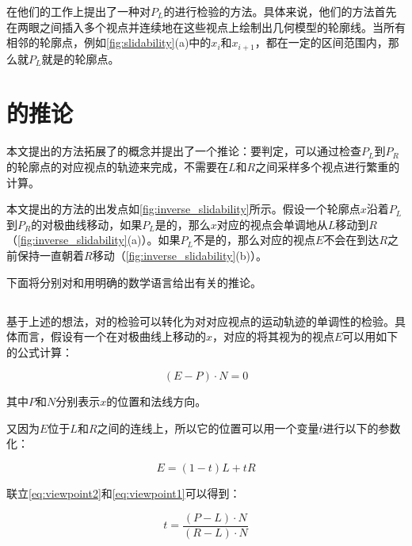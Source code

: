 \citeauthor{kim2013stereoscopic}在他们的工作上提出了一种对$P_L$的\epsl{}进行检验的方法。具体来说，他们的方法首先在两眼之间插入多个视点并连续地在这些视点上绘制出几何模型的轮廓线。当所有相邻的轮廓点，例如\autoref{fig:slidability}(a)中的$x_i$和$x_{i+1}$，都在一定的区间范围内，那么就$P_L$就是\epslb{}的轮廓点。

\section{\epsl{}的推论}

本文提出的方法拓展了\epsl{}的概念并提出了一个推论：要判定\epsl{}，可以通过检查$P_L$到$P_R$的轮廓点的对应视点的轨迹来完成，不需要在$L$和$R$之间采样多个视点进行繁重的计算\cite{kim2013stereoscopic}。

本文提出的方法的出发点如\autoref{fig:inverse_slidability}所示。假设一个轮廓点$x$沿着$P_L$到$P_R$的对极曲线移动，如果$P_L$是\epslb{}的，那么$x$对应的视点会单调地从$L$移动到$R$（\autoref{fig:inverse_slidability}(a)）。如果$P_L$不是\epslb{}的，那么对应的视点$E$不会在到达$R$之前保持一直朝着$R$移动（\autoref{fig:inverse_slidability}(b)）。

下面将分别对\con{}和\scon{}用明确的数学语言给出有关\epsl{}的推论。

\subsection{\con{}}

基于上述的想法，对\epsl{}的检验可以转化为对对应视点的运动轨迹的单调性的检验。具体而言，假设有一个在对极曲线上移动的\conp{}$x$，对应的将其视为\conp{}的视点$E$可以用如下的公式计算：

\begin{equation}\label{eq:viewpoint2}
    {(E - P)}\cdot{N} = 0
\end{equation}

其中$P$和$N$分别表示\conp{}$x$的位置和法线方向。

又因为$E$位于$L$和$R$之间的连线上，所以它的位置可以用一个变量$t$进行以下的参数化：

\begin{equation}\label{eq:viewpoint1}
    E = (1-t)L+t R
\end{equation}

联立\autoref{eq:viewpoint2}和\autoref{eq:viewpoint1}可以得到：

\begin{equation}\label{eq:t1}
t = \frac{(P-L)\cdot{N}}{(R-L)\cdot{N}}
\end{equation}

